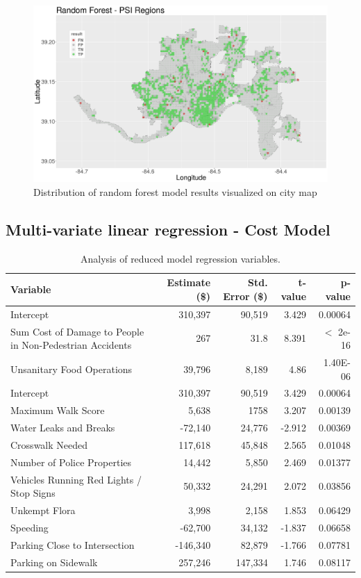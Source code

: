 \documentclass{llncs}
\begin{document}
\FloatBarrier
\begin{figure}
 	\includegraphics[width=\textwidth, height=\textheight, keepaspectratio]{RFBinaryResultsMap.png}
 	\caption{Distribution of random forest model results visualized on city map}
	\label{figure : rfbinarymap}
\end{figure}
\FloatBarrier

\subsection{Multi-variate linear regression - Cost Model}

\FloatBarrier
\begin{table}[!h]
\begin{center}
\caption{Analysis of reduced model regression variables.}
\label{table:RegressionAnalysis}
\begin{tabular}{lrrrr}
\hline
\rule{0pt}{12pt}
Variable
& Estimate (\$)
& Std. Error (\$)
& t-value
& p-value\\[2pt]
\hline
Intercept&310,397&90,519&3.429&0.00064\\
Sum Cost of Damage to People in Non-Pedestrian Accidents&267&31.8&8.391&$<$ 2e-16\\
Unsanitary Food Operations&39,796&8,189&4.86&1.40E-06\\
Intercept&310,397&90,519&3.429&0.00064\\
Maximum Walk Score&5,638&1758&3.207&0.00139\\
Water Leaks and Breaks&-72,140&24,776&-2.912&0.00369\\
Crosswalk Needed&117,618&45,848&2.565&0.01048\\
Number of Police Properties&14,442&5,850&2.469&0.01377\\
Vehicles Running Red Lights / Stop Signs&50,332&24,291&2.072&0.03856\\
Unkempt Flora&3,998&2,158&1.853&0.06429\\
Speeding&-62,700&34,132&-1.837&0.06658\\
Parking Close to Intersection&-146,340&82,879&-1.766&0.07781\\
Parking on Sidewalk&257,246&147,334&1.746&0.08117\\[2pt]
\hline
\end{tabular}
\end{center}
\end{table}
\FloatBarrier
\end{document}
